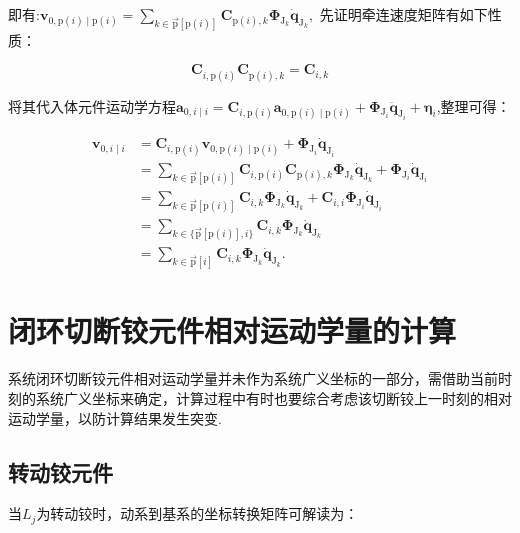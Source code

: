 即有:$\boldsymbol{v}_{0, \mathrm{p}(i) \mid \mathrm{p}(i)}=\sum_{k \in \overrightarrow{\mathrm{p}}[\mathrm{p}(i)]} \boldsymbol{C}_{\mathrm{p}(i), k} \boldsymbol{\Phi}_{\mathrm{J}_{k}} \dot{\boldsymbol{q}}_{\mathrm{J}_{k}},$ 先证明牵连速度矩阵有如下性质：

\[
\boldsymbol{C}_{i,\mathrm{p}(i)}\boldsymbol{C}_{\mathrm{p}(i),k}=\boldsymbol{C}_{i,k}
\]

将其代入体元件运动学方程$\boldsymbol{a}_{0, i \mid i}=\boldsymbol{C}_{i, \mathrm{p}(i)} \boldsymbol{a}_{0, \mathrm{p}(i) \mid \mathrm{p}(i)}+\boldsymbol{\Phi}_{\mathrm{J}_{i}} \ddot{\boldsymbol{q}}_{\mathrm{J}_{i}}+\boldsymbol{\eta}_{i}$,整理可得：

\[
\begin{aligned}
\boldsymbol{v}_{0, i \mid i} & =\boldsymbol{C}_{i, \mathrm{p}(i)} \boldsymbol{v}_{0, \mathrm{p}(i) \mid \mathrm{p}(i)}+\boldsymbol{\Phi}_{\mathrm{J}_{i}} \dot{\boldsymbol{q}}_{\mathrm{J}_{i}} \\
& =\sum_{k \in \overrightarrow{\mathrm{p}}[\mathrm{p}(i)]} \boldsymbol{C}_{i, \mathrm{p}(i)} \boldsymbol{C}_{\mathrm{p}(i), k} \boldsymbol{\Phi}_{\mathrm{J}_{k}} \dot{\boldsymbol{q}}_{\mathrm{J}_{k}}+\boldsymbol{\Phi}_{\mathrm{J}_{i}} \dot{\boldsymbol{q}}_{\mathrm{J}_{i}} \\
& =\sum_{k \in \overrightarrow{\mathrm{p}}[\mathrm{p}(i)]} \boldsymbol{C}_{i, k} \boldsymbol{\Phi}_{\mathrm{J}_{k}} \dot{\boldsymbol{q}}_{\mathrm{J}_{k}}+\boldsymbol{C}_{i, i} \boldsymbol{\Phi}_{\mathrm{J}_{i}} \dot{\boldsymbol{q}}_{\mathrm{J}_{i}} \\
& =\sum_{k \in\{\overrightarrow{\mathrm{p}}[\mathrm{p}(i)], i\}} \boldsymbol{C}_{i, k} \boldsymbol{\Phi}_{\mathrm{J}_{k}} \dot{\boldsymbol{q}}_{\mathrm{J}_{k}} \\
& =\sum_{k \in \overrightarrow{\mathrm{p}}[i]} \boldsymbol{C}_{i, k} \boldsymbol{\Phi}_{\mathrm{J}_{k}} \dot{\boldsymbol{q}}_{\mathrm{J}_{k}} .
\end{aligned}
\]
\section{闭环切断铰元件相对运动学量的计算}
系统闭环切断铰元件相对运动学量并未作为系统广义坐标的一部分，需借助当前时刻的系统广义坐标来确定，计算过程中有时也要综合考虑该切断铰上一时刻的相对运动学量，以防计算结果发生突变.
\subsection{转动铰元件}
当$L_{j}$为转动铰时，动系到基系的坐标转换矩阵可解读为：


